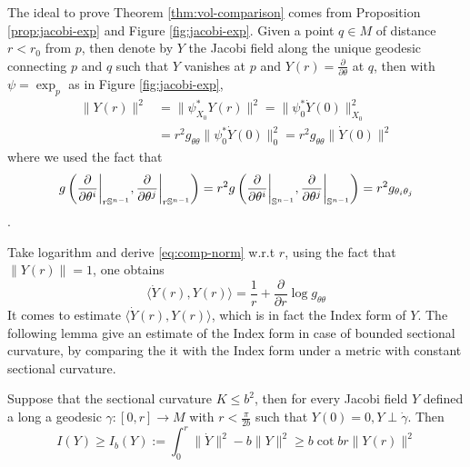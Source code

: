 \documentclass[11pt]{article}
\begin{document}
The ideal to prove Theorem \ref{thm:vol-comparison} comes from Proposition
\ref{prop:jacobi-exp} and Figure \ref{fig:jacobi-exp}. Given a point \(q\in M\) of distance
\(r< r_0\) from \(p\), then denote by \(Y\) the Jacobi field along the unique
geodesic connecting \(p\) and \(q\) such that \(Y\) vanishes at \(p\) and 
\(Y(r) = \frac{\partial}{\partial \theta}\) at \(q\), then with \(\psi =\exp_p\) as in Figure \ref{fig:jacobi-exp},
\begin{equation}
\label{eq:comp-norm}
\begin{split}
\| Y(r)\|^2  &= \| \psi_{X_0}^* Y(r) \|^2 = \| \psi_0^* \dot Y(0)\|^2_{X_0}\\
     &= r^2 g_{\theta\theta} \|\psi_0^*\dot Y(0)\|_0^2 = r^2 g_{\theta\theta} \|\dot Y(0)\|^2
\end{split}   
\end{equation}
where we used the fact that
\[ g\left(\restr{\frac{\partial}{\partial \theta^i}}{r
\mathbb{S}^{n-1}},\restr{\frac{\partial}{\partial \theta^j}}{r \mathbb{S}^{n-1}}\right) = r^2
g\left(\restr{\frac{\partial}{\partial
\theta^i}}{\mathbb{S}^{n-1}},\restr{\frac{\partial}{\partial \theta^j}}{\mathbb{S}^{n-1}}\right)
= r^2 g_{\theta_i\theta_j} \].

Take logarithm and derive \eqref{eq:comp-norm} w.r.t \(r\), using the fact that
\(\|Y(r)\| = 1\), one obtains
\begin{equation}
\label{eq:comp-norm-ap}
\langle \dot Y(r), Y(r) \rangle = \frac{1}{r} + \frac{\partial}{\partial r}\log g_{\theta\theta}
\end{equation}
It comes to estimate \(\langle \dot Y(r), Y(r) \rangle\), which is in fact the Index
form of \(Y\). The following lemma give an estimate of the Index form in case of bounded
sectional curvature, by comparing the it with the Index form under a metric with constant
sectional curvature. 

\begin{lemma}
\label{lem:compare-const-sec-curv}
Suppose that the sectional curvature \(K \leq b^2\), then for every Jacobi field \(Y\)
defined a long a geodesic \(\gamma: [0,r] \longrightarrow M\) with \(r< \frac{\pi}{2b}\) such that \(Y(0)=0, Y\perp \dot\gamma\). Then
\[
 I(Y) \geq I_b(Y):=\int_0^r \| \dot Y\|^2 - b \|Y\|^2 \geq b\cot br \|Y(r)\|^2
\]
\end{lemma}
\end{document}
